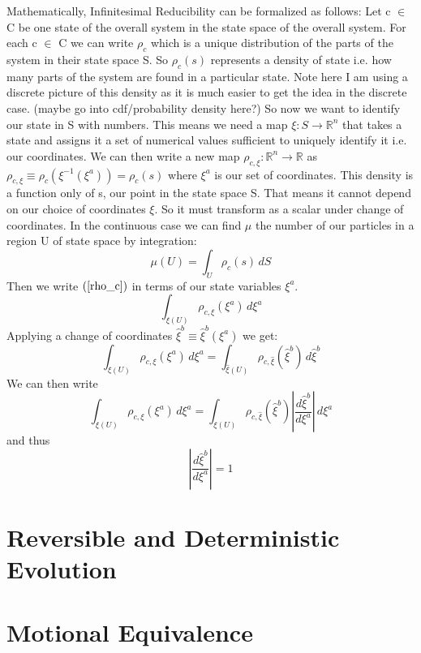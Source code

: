 \documentclass{article}
\begin{document}
	Mathematically, Infinitesimal Reducibility can be formalized as follows: Let c $\in$ C be one state of the overall system in the state space of the overall system. For each c $\in$ C we can write $\rho_c$ which is a unique distribution of the parts of the system in their state space S. So $\rho_c(s)$ represents a density of state i.e. how many parts of the system are found in a particular state. Note here I am using a discrete picture of this density as it is much easier to get the idea in the discrete case. (maybe go into cdf/probability density here?) So now we want to identify our state in S with numbers. This means we need a map $\xi : S \rightarrow \mathbb{R}^n $ that takes a state and assigns it a set of numerical values sufficient to uniquely identify it i.e. our coordinates. We can then write a new map $\rho_{c,\xi} : \mathbb{R}^n \rightarrow \mathbb{R}$ as $\rho_{c,\xi} \equiv \rho_c(\xi^{-1}(\xi^a)) = \rho_c(s)$ where $\xi^a$ is our set of coordinates. This density is a function only of s, our point in the state space S. That means it cannot depend on our choice of coordinates $\xi$. So it must transform as a scalar under change of coordinates. In the continuous case we can find $\mu$ the number of our particles in a region U of state space by integration:
	\begin{equation}
	\label{rho_c}
	\mu(U) = \int_{U} \rho_c(s)\, dS
	\end{equation}
Then we write $(\ref{rho_c})$ in terms of our state variables $\xi^a$. 
	\begin{equation}
	\label{rho_xia}
	\int_{\xi(U)} \rho_{c,\xi}(\xi^a) \, d\xi^a
	\end{equation}
Applying a change of coordinates $\hat{\xi}^b \equiv \hat{\xi}^b(\xi^a)$ we get:
	\begin{equation}
	\label{rho_xib}
	\int_{\xi(U)} \rho_{c,\xi}(\xi^a) \, d\xi^a = \int_{\hat{\xi}(U)} \rho_{c,\hat{\xi}}(\hat{\xi}^b) \, d\hat{\xi}^b
	\end{equation}
We can then write
	\begin{equation}
	\label{rho_J}
	\int_{\xi(U)} \rho_{c,\xi}(\xi^a) \, d\xi^a = \int_{\xi(U)} \rho_{c,\hat{\xi}}(\hat{\xi}^b) |\frac{d\hat{\xi}^b}{d\xi^a}| \, d\xi^a
	\end{equation}
and thus
	\begin{equation}
	\label{}
	|\frac{d\hat{\xi}^b}{d\xi^a}| = 1
	\end{equation}

\section{Reversible and Deterministic Evolution}

\section{Motional Equivalence}
\end{document}
